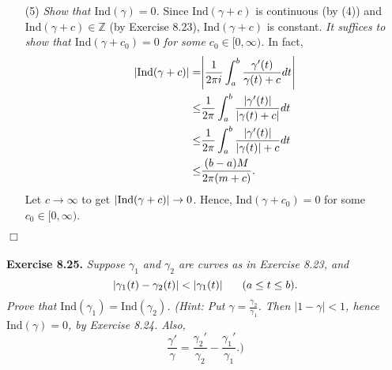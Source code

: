 \documentclass{article}
\begin{document}
\begin{enumerate}
\item[(5)]
  \emph{Show that $\mathrm{Ind}(\gamma) = 0$.}
  Since $\mathrm{Ind}(\gamma+c)$ is continuous (by (4)) and
  $\mathrm{Ind}(\gamma+c) \in \mathbb{Z}$ (by Exercise 8.23),
  $\mathrm{Ind}(\gamma+c)$ is constant.
  \emph{It suffices to show that $\mathrm{Ind}(\gamma+c_0) = 0$ for some $c_0 \in [0,\infty)$.}
  In fact,
  \begin{align*}
    \abs{ \mathrm{Ind}(\gamma+c) }
    =& \abs{ \frac{1}{2\pi i}\int_{a}^{b} \frac{\gamma'(t)}{\gamma(t)+c} dt } \\
    \leq& \frac{1}{2\pi} \int_{a}^{b} \frac{|\gamma'(t)|}{|\gamma(t)+c|} dt \\
    \leq& \frac{1}{2\pi} \int_{a}^{b} \frac{|\gamma'(t)|}{|\gamma(t)|+c} dt \\
    \leq& \frac{(b-a)M}{2\pi(m+c)}.
  \end{align*}
  Let $c \to \infty$ to get $\abs{ \mathrm{Ind}(\gamma+c) } \to 0$.
  Hence, $\mathrm{Ind}(\gamma+c_0) = 0$ for some $c_0 \in [0,\infty)$.
\end{enumerate}
$\Box$ \\\\






\textbf{Exercise 8.25.}
\emph{Suppose $\gamma_1$ and $\gamma_2$ are curves as in Exercise 8.23,
and
\[
  \abs{ \gamma_1(t) - \gamma_2(t) } < \abs{ \gamma_1(t) }
  \:\:\:\:\:\:\:\: (a \leq t \leq b).
\]
Prove that $\mathrm{Ind}(\gamma_1) = \mathrm{Ind}(\gamma_2)$.
(Hint: Put $\gamma = \frac{\gamma_2}{\gamma_1}$.
Then $|1-\gamma| < 1$, hence $\mathrm{Ind}(\gamma) = 0$, by Exercise 8.24.
Also,
\[
  \frac{\gamma'}{\gamma} = \frac{\gamma_2'}{\gamma_2} - \frac{\gamma_1'}{\gamma_1}.)
\]} \\
\end{document}
